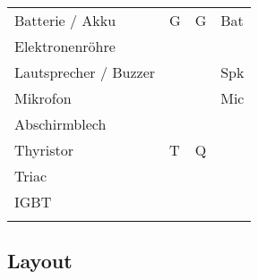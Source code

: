 \begin{table}[h!]
\begin{tabular}{llll}
  \rowcolor{lgray}  Batterie / Akku       & G             & G                 & Bat \\
  \rowcolor{white}  Elektronenröhre       &               &                   &  \\
  \rowcolor{lgray}  Lautsprecher / Buzzer &               &                   & Spk \\
  \rowcolor{white}  Mikrofon              &               &                   & Mic \\
  \rowcolor{lgray}  Abschirmblech         &               &                   &  \\
  \rowcolor{white}  Thyristor             & T             & Q                 &  \\
  \rowcolor{lgray}  Triac                 &               &                   &  \\
  \rowcolor{white}  IGBT                  &               &                   &  \\
  \rowcolor{lgray}  
  \end{tabular}
\end{table}

\subsection{Layout}